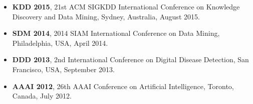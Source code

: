 \begin{itemize}
  \item {\bf KDD 2015}, 21st ACM SIGKDD International Conference on 
    Knowledge Discovery and Data Mining, Sydney, Australia, August 2015.
  \item {\bf SDM 2014}, 2014 SIAM International Conference on Data Mining,
    Philadelphia, USA, April 2014.
  \item {\bf DDD 2013}, 2nd International Conference on Digital Disease
    Detection, San Francisco, USA, September 2013.
  \item {\bf AAAI 2012}, 26th AAAI Conference on Artificial Intelligence,
    Toronto, Canada, July 2012.
\end{itemize}


